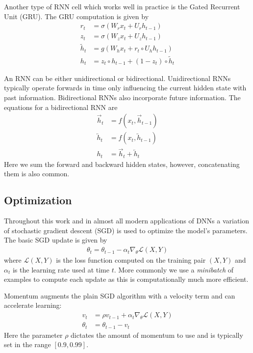 Another type of RNN cell which works well in practice is the Gated Recurrent
Unit (GRU). The GRU computation is given by
\begin{align*}
    r_t &= \sigma(W_r x_t + U_r h_{t-1}) \\
    z_t &= \sigma(W_z x_t + U_z h_{t-1}) \\
    \tilde{h}_t &= g(W_h x_t + r_t \circ U_h h_{t-1}) \\
    h_t &= z_t \circ h_{t-1} + (1 - z_t) \circ \tilde{h}_t
\end{align*}

An RNN can be either unidirectional or bidirectional. Unidirectional RNNs
typically operate forwards in time only influencing the current hidden state
with past information. Bidirectional RNNs also incorporate future information.
The equations for a bidirectional RNN are
\begin{align*}
    \overrightarrow{h}_t &= f(x_t, \overrightarrow{h}_{t-1}) \\
    \overleftarrow{h}_t &= f(x_t, \overleftarrow{h}_{t-1}) \\
    h_t &= \overrightarrow{h}_t + \overleftarrow{h}_t
\end{align*}
Here we sum the forward and backward hidden states, however, concatenating them
is also common.

\subsection{Optimization}

Throughout this work and in almost all modern applications of DNNs a variation
of stochastic gradient descent (SGD) is used to optimize the model's
parameters. The basic SGD update is given by
\begin{align*}
    \theta_{t} = \theta_{t-1} - \alpha_t \nabla_{\theta} \mathcal{L}(X, Y)
\end{align*}
where $\mathcal{L}(X, Y)$ is the loss function computed on the training pair
$(X, Y)$ and $\alpha_t$ is the learning rate used at time $t$. More commonly we
use a {\it minibatch} of examples to compute each update as this is
computationally much more efficient.

Momentum augments the plain SGD algorithm with a velocity term and can
accelerate learning:
\begin{align*}
    v_t &= \rho v_{t-1} + \alpha_t \nabla_{\theta} \mathcal{L}(X, Y) \\
    \theta_t &= \theta_{t-1} - v_t 
\end{align*}
Here the parameter $\rho$ dictates the amount of momentum to use and is
typically set in the range $[0.9, 0.99]$.

